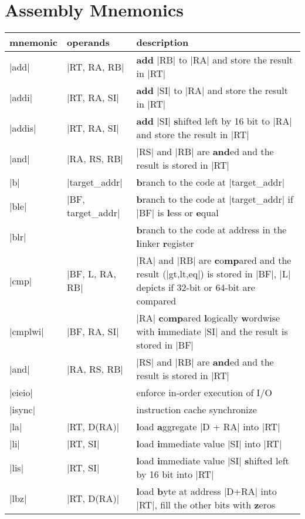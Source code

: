 \section{Assembly Mnemonics}
\label{sec:asmmnem}
\begin{table}[htbp]
\begin{tabular}{l l p{9cm}}
    mnemonic & operands & description \\
    \hline
    |add| & |RT, RA, RB| & \textbf{add} |RB| to |RA| and store the result in |RT| \\
    |addi| & |RT, RA, SI| & \textbf{add} |SI| to |RA| and store the result in |RT| \\
    |addis| & |RT, RA, SI| & \textbf{add} |SI| \textbf{s}hifted left by 16 bit to |RA| and store the result in |RT| \\
    |and| & |RA, RS, RB| & |RS| and |RB| are \textbf{and}ed and the result is stored in |RT| \\
    |b| & |target_addr| & \textbf{b}ranch to the code at |target_addr|\\
    |ble| & |BF, target_addr| & \textbf{b}ranch to the code at |target_addr| if |BF| is \textbf{l}ess or \textbf{e}qual \\
    |blr| & & \textbf{b}ranch to the code at address in the \textbf{l}inker \textbf{r}egister \\
    |cmp| & |BF, L, RA, RB| & |RA| and |RB| are \textbf{c}o\textbf{mp}ared and the result (|gt,lt,eq|) is stored in |BF|, |L| depicts if 32-bit or 64-bit are compared \\
    |cmplwi| & |BF, RA, SI| & |RA| \textbf{c}o\textbf{mp}ared \textbf{l}ogically \textbf{w}ordwise with \textbf{i}mmediate |SI| and the result is stored in |BF|\\
    |and| & |RA, RS, RB| & |RS| and |RB| are \textbf{and}ed and the result is stored in |RT| \\
    |eieio| & & enforce in-order execution of I/O\\
    |isync| & & instruction cache synchronize\\
    |la| & |RT, D(RA)| & \textbf{l}oad \textbf{a}ggregate |D + RA| into |RT|\\
    |li| & |RT, SI| & \textbf{l}oad \textbf{i}mmediate value |SI| into |RT|\\
    |lis| & |RT, SI| & \textbf{l}oad \textbf{i}mmediate value |SI| \textbf{s}hifted left by 16 bit into |RT|\\
    |lbz| & |RT, D(RA)| & \textbf{l}oad \textbf{b}yte at address |D+RA| into |RT|, fill the other bits with \textbf{z}eros \\

\end{tabular}
\end{table}
